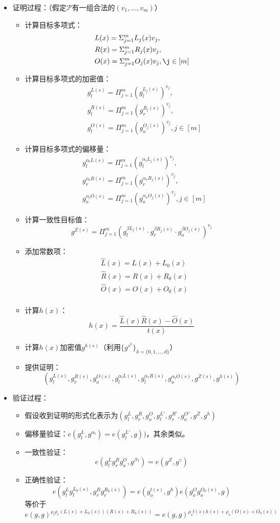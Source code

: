 \documentclass[12pt]{article}
\newcommand{\pp}{$\mathcal{P}$}
\begin{document}
\begin{itemize}
   \item 证明过程：（假定\pp 有一组合法的$(v_1,...,v_m)$）
   \begin{itemize}
   	\item 计算目标多项式：
   	   \begin{align*}
   	&L(x)= \Sigma_{j=1}^m L_j(x)v_j,\\
   	& R(x)= \Sigma_{j=1}^m R_j(x)v_j,\\
   	& O(x)= \Sigma_{j=1}^m O_j(x)v_j, \j \in [m]
   	\end{align*}
    \item 计算目标多项式的加密值：
   \begin{align*}
   &g_l^{L(s)}= \Pi_{j=1}^m (g_l^{L_j(s)})^{v_j},\\
   &  g_l^{R(s)}= \Pi_{j=1}^m (g_r^{R_j(s)})^{v_j},\\
   &  g_l^{O(s)}= \Pi_{j=1}^m (g_o^{O_j(s)})^{v_j}, j \in [m]
   \end{align*}
   \item 计算目标多项式的偏移量：
    \begin{align*}
   &g_l^{\alpha_l L(s)}= \Pi_{j=1}^m (g_l^{\alpha_l L_j(s)})^{v_j},\\
   &g_r^{\alpha_l R(s)}= \Pi_{j=1}^m (g_r^{\alpha_r R_j(s)})^{v_j},\\
   &g_o^{\alpha_l O(s)}= \Pi_{j=1}^m (g_o^{\alpha_o O_j(s)})^{v_j}, j \in [m]
   \end{align*}
   \item 计算一致性目标值：
   $$g^{Z(s)} =\Pi_{j=1}^m (g_l^{\beta L_j(s)}\cdot g_r^{\beta R_j(s)}\cdot g_o^{\beta O_j(s)})^{v_j}$$
\item 添加常数项：
\begin{align*}
	& \hat{L}(x)=  L(x)+L_0(x)\\
	& \hat{R}(x)=  R(x)+R_0(x)\\
	& \hat{O}(x)=  O(x)+O_0(x)\\
\end{align*}
\item 计算$h(x)$：
$$ h(x) = \frac{\hat{L}(x)\hat{R}(x)-\hat{O}(x)}{t(x)}$$
\item 计算$h(x)$加密值$g^{h(s)}$（利用$\{g^{s^k}\}_{k=\{0,1,...,d\}}$）
\item 提供证明：
$$ (g_l^{L(s)},g_r^{R(s)},g_o^{O(s)}, g_l^{\alpha_l L(s)},g_l^{\alpha_r R(s)},g_o^{\alpha_l O(s)},g^{Z(s)},g^{h(s)})$$
   \end{itemize}
\item 验证过程：
\begin{itemize}
	\item 假设收到证明的形式化表示为$(g_l^L,g_r^R,g_o^O,g_l^{L'},g_r^{R'},g_o^{O'},g^Z,g^h)$
	\item  偏移量验证：$e(g_l^L,g^{\alpha_l})=e(g_l^{L'},g))$，其余类似。
	\item 一致性验证：
	$$e(g_l^Lg_r^Rg_o^O,g^{\beta\gamma})=e(g^Z,g^{\gamma})$$
	\item 正确性验证：
	$$e(g_l^Lg_l^{L_0(s)},g_r^Rg_r^{R_0(s)})=e(g_o^{t(s)},g^h)e(g_o^Og_o^{O_0(s)},g)$$
	等价于
	$$ e(g,g)^{\rho_l\rho_r(L(s)+L_0(s))(R(s)+R_0(s))}=e(g,g)^{\rho_ot(s)h(s)+\rho_o(O(s)+O_0(s))}$$
\end{itemize}
\end{itemize}
\end{document}
